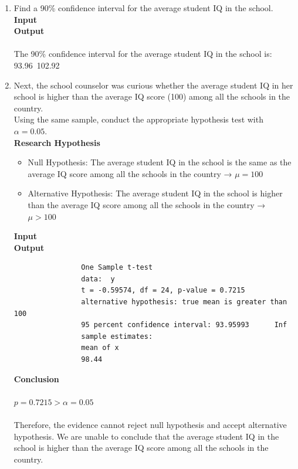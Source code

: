 \documentclass[12pt,letterpaper]{article}
\begin{document}
\begin{enumerate}
	\item Find a 90\% confidence interval for the average student IQ in the school.\\
\newpage
		 \textbf{Input}\\
			 
		
		  \textbf{Output}\\\\
		   \noindent The 90\% confidence interval for the average student IQ in the school is: 93.96~102.92 
		
		
	\item Next, the school counselor was curious  whether the average student IQ in her school is higher than the average IQ score (100) among all the schools in the country.\\ 
	
	\noindent Using the same sample, conduct the appropriate hypothesis test with $\alpha=0.05$.\\
	
	\textbf{Research Hypothesis}
		\begin{itemize} 
\item Null Hypothesis: The average student IQ in the school is the same as the average IQ score among all the schools in the country → $\mu = 100$
\item Alternative Hypothesis: The average student IQ in the school is higher than the average IQ score among all the schools in the country → $\mu > 100$
		\end{itemize}
		
\newpage
		
		\noindent \textbf{Input}\\
				 
				
		\noindent \textbf{Output}
		\begin{verbatim}
				One Sample t-test
				data:  y 
				t = -0.59574, df = 24, p-value = 0.7215
				alternative hypothesis: true mean is greater than 100
				95 percent confidence interval: 93.95993      Inf
				sample estimates:
				mean of x     
				98.44 
		\end{verbatim}
		
		\textbf{Conclusion}\\\\
		\noindent $p = 0.7215 > \alpha=0.05$ \\\\Therefore, the evidence cannot reject null hypothesis and accept alternative hypothesis. We are unable to conclude that the average student IQ in the school is higher than the average IQ score among all the schools in the country.
\end{enumerate}
\end{document}
